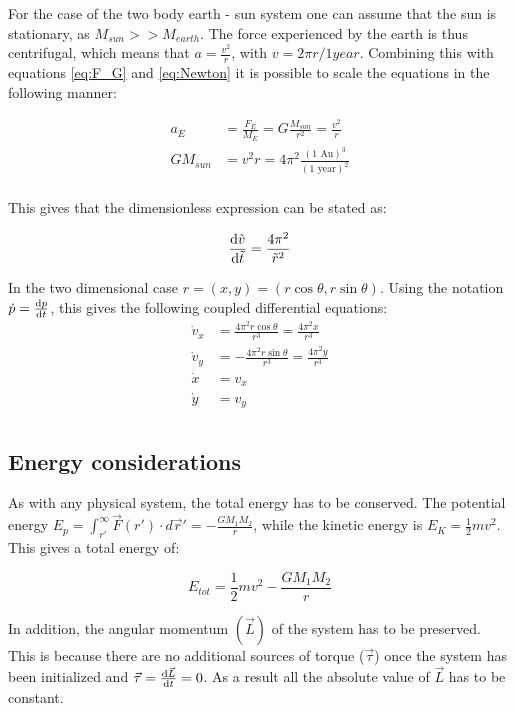 For the case of the two body earth - sun system one can assume that the sun is stationary, as $ M_{sun}>> M_{earth} $. The force experienced by the earth is thus centrifugal, which means that $ a = \frac{v^2}{r} $, with $ v = 2\pi r /1year $.  
Combining this with equations \ref{eq:F_G} and \ref{eq:Newton} it is possible to scale the equations in the following manner:

\begin{align}
	{a}_E &= \frac{{F}_E}{M_E}= G\frac{M_{sun}}{r^2} 
= \frac{v^2}{r}\\
	GM_{sun}&= v^2 r = 4\pi^2 \frac{(\text{1 Au})^3}{(\text{1 year})^2}\\
\end{align}

This gives that the dimensionless expression can be stated as: 

	\begin{equation}
		\dv{\tilde{v}}{\tilde{t}} = \frac{4\pi^2}{\tilde{r}^2} 
	\end{equation}
	
In the two dimensional case $ r = (x,y) = (r\cos\theta, r\sin\theta) $. Using the notation $ 	\dot{p}  = \dv{p}{t}$, this gives the following coupled differential equations: 
\begin{align}
\dot{v}_x  &=  \frac{4\pi^2r\cos\theta}{{r}^3}  = \frac{4\pi^2x}{{r}^3}  \label{eq:vx}\\
\dot{v}_y	 &= -\frac{4\pi^2r\sin\theta}{{r}^3}  = \frac{4\pi^2y}{{r}^3 \label{eq:vy}}\\
	\dot{x}  &= v_x \label{eq:x}\\
	\dot{y}  &= v_y \label{eq:y}\\
\end{align}

\subsection{Energy considerations}

As with any physical system, the total energy has to be conserved. The potential energy $ E_p = \int_{r'}^{\infty} \vec{F}(r') \cdot  d\vec{r}' = -\frac{G	M_1M_2}{r} $, while the kinetic energy is $ E_K  = \frac{1}{2}mv^2$. This gives a total energy of:

\begin{equation}
	E_{tot} = \frac{1}{2}mv^2 - \frac{G	M_1M_2}{r} \label{eq: toten}
\end{equation}

 In addition, the angular momentum $ (\vec{L}) $ of the system has to be preserved. This is because there are no additional sources of torque ($ \vec{\tau} $) once the system has been initialized and $ \vec{\tau} = \dv{{\vec{L}}}{t} =0$. As a result all the absolute value of $ \vec{L} $ has to be constant. 

